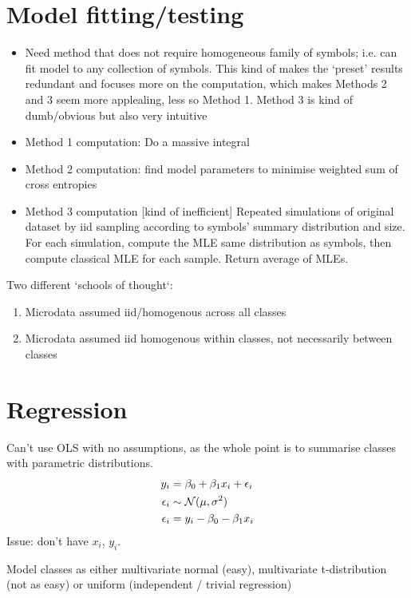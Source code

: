 \documentclass[11pt,paper=a4,numbers=noendperiod]{scrartcl} %
\begin{document}
\section{Model fitting/testing}
\begin{itemize}
    \item Need method that does not require homogeneous family of symbols; i.e.
        can fit model to any collection of symbols. This kind of makes the
        `preset' results redundant and focuses more on the computation, which
        makes Methods 2 and 3 seem more applealing, less so Method 1. Method 3
        is kind of dumb/obvious but also very intuitive
    \item Method 1 computation: Do a massive integral
    \item Method 2 computation: find model parameters to minimise weighted sum
        of cross entropies
    \item Method 3 computation [kind of inefficient] Repeated simulations of
        original dataset by iid sampling according to symbols' summary
        distribution and size. For each simulation, compute the MLE same
        distribution as symbols, then compute classical MLE for each sample.
        Return average of MLEs.
\end{itemize}

Two different `schools of thought`:
\begin{enumerate}
    \item{Microdata assumed iid/homogenous across all classes}
    \item{Microdata assumed iid homogenous within classes, not necessarily
        between classes}
\end{enumerate}

\section{Regression}
Can't use OLS with no assumptions, as the whole point is to summarise classes
with parametric distributions.
\begin{align*}
    y_i &= \beta_0 + \beta_1 x_i + \epsilon_i \\
    \epsilon_i &\sim \mathcal{N}(\mu, \sigma^2) \\
    \epsilon_i &= y_i - \beta_0 - \beta_1 x_i
\end{align*}
Issue: don't have $x_i$, $y_i$.

Model classes as either multivariate normal (easy), multivariate t-distribution
(not as easy) or uniform (independent / trivial regression)
\end{document}
